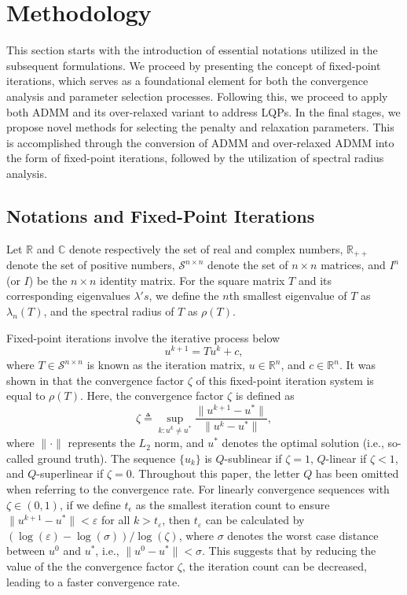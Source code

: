 \documentclass[letterpaper]{article} %
\begin{document}
\section{Methodology}
This section starts with the introduction of essential notations utilized in the subsequent formulations. We proceed by presenting the concept of fixed-point iterations, which serves as a foundational element for both the convergence analysis and parameter selection processes. Following this, we proceed to apply both ADMM and its over-relaxed variant to address LQPs. In the final stages, we propose novel methods for selecting the penalty and relaxation parameters. This is accomplished through the conversion of ADMM and over-relaxed ADMM into the form of fixed-point iterations, followed by the utilization of spectral radius analysis.

\subsection{Notations and Fixed-Point Iterations}
Let $\mathbb{R}$ and $\mathbb{C}$ denote respectively the set of real and complex numbers, $\mathbb{R}_{++}$ denote the set of positive numbers, $\mathcal{S}^{n\times n}$ denote the set of $n \times n$ matrices, and $I^n$ (or $I$) be the $n \times n$ identity matrix. For the square matrix $T$ and its corresponding eigenvalues $\lambda's$, we define the $n$th smallest eigenvalue of $T$ as $\lambda_n(T)$, and the spectral radius of $T$ as $\rho(T)$.

Fixed-point iterations involve the iterative process below
\begin{equation*}
	u^{k+1}=Tu^{k}+c,
\end{equation*}
where $T \in \mathcal{S}^{n\times n}$ is known as the iteration matrix, $u\in \mathbb{R}^{n}$, and $c\in \mathbb{R}^{n}$. It was shown in  \cite{ghadimi2014optimal} that the convergence factor $\zeta$ of this fixed-point iteration system is equal to $\rho(T)$. Here, the convergence factor $\zeta$ is defined as
\begin{equation*}
	\zeta\triangleq \sup\limits_{k:u^k\neq u^*}\frac{\|u^{k+1}-u^*\|}{\|u^{k}-u^*\|},
\end{equation*}
where $\|\cdot\|$ represents the $L_2$ norm, and $u^{*}$ denotes the optimal solution (i.e., so-called ground truth).  The sequence $\{u_k\}$ is $Q$-sublinear if $\zeta=1$, $Q$-linear if $\zeta<1$, and $Q$-superlinear if $\zeta=0$. Throughout this paper, the letter $Q$ has been omitted when referring to the convergence rate. For linearly convergence sequences with $\zeta\in (0,1)$, if we define $t_{\epsilon}$ as the smallest iteration count to ensure $\|u^{k+1}-u^{*}\|<\varepsilon$ for all $k>t_{\varepsilon}$, then $t_{\varepsilon}$ can be calculated by $\left(\log(\varepsilon)-\log(\sigma)\right)/ \log(\zeta)$, where $\sigma$ denotes the worst case distance between $u^{0}$ and $u^{*}$, i.e., $\|u^{0}-u^{*}\|<\sigma$. This suggests that by reducing the value of the the convergence factor $\zeta$, the iteration count can be decreased, leading to a faster convergence rate.
\end{document}
